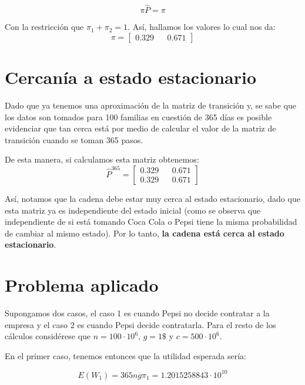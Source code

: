 \documentclass[11pt]{article}
\theoremstyle{definition}
\theoremstyle{remark}
\theoremstyle{remark}
\begin{document}
\begin{equation}
  \label{eq:4}
  \pi \hat{P} = \pi
\end{equation}

Con la restricción que $\pi_1 + \pi_2 = 1$. Así, hallamos los valores
lo cual nos da:
\begin{equation}
  \label{eq:5}
  \pi =
  \begin{bmatrix}
    0.329 && 0.671
  \end{bmatrix}
\end{equation}

\section{Cercanía a estado estacionario}
Dado que ya tenemos una aproximación de la matriz de transición y, se
sabe que los datos son tomados para 100 familias en cuestión de 365
días es posible evidenciar que tan cerca está por medio de calcular el
valor de la matriz de transición cuando se toman 365 pasos.

De esta manera, si calculamos esta matriz obtenemos:
\begin{equation}
  \label{eq:6}
  \hat{P}^{365} =
  \begin{bmatrix}
    0.329 && 0.671 \\
    0.329 && 0.671
  \end{bmatrix}
\end{equation}

Así, notamos que la cadena debe estar muy cerca al estado
estacionario, dado que esta matriz ya es independiente del estado
inicial (como se observa que independiente de si está tomando Coca
Cola o Pepsi tiene la misma probabilidad de cambiar al mismo
estado). Por lo tanto, \textbf{la cadena está cerca al estado
  estacionario}.

\section{Problema aplicado}
Supongamos dos casos, el caso 1 es cuando Pepsi no decide contratar a
la empresa y el caso 2 es cuando Pepsi decide contratarla. Para el
resto de los cálculos considérese que $n = 100 \cdot 10^6$, $g = 1 \$$
y $c = 500 \cdot 10^6$.

En el primer caso, tenemos entonces que la utilidad esperada sería:

\begin{equation}
  \label{eq:7}
  E(W_1) = 365ng \pi_1 = 1.2015258843 \cdot 10^{10}
\end{equation}
\end{document}
